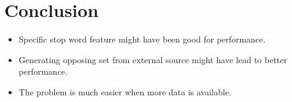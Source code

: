 \section{Conclusion} \label{sec:conclusion}

\begin{itemize}
    \item Specific stop word feature might have been good for performance.
    \item Generating opposing set from external source might have lead to better
        performance.
    \item The problem is much easier when more data is available.
\end{itemize}
